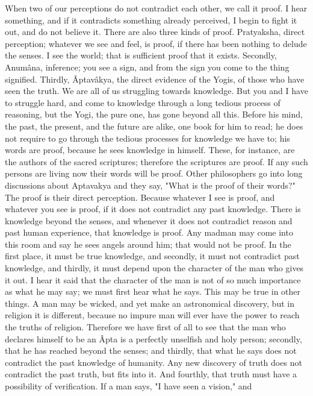 When two of our perceptions do not contradict each other, we
call it proof. I hear something, and if it contradicts something
already perceived, I begin to fight it out, and do not believe it.
There are also three kinds of proof. Pratyaksha, direct perception;
whatever we see and feel, is proof, if there has been nothing to delude
the senses. I see the world; that is sufficient proof that it exists.
Secondly, Anumâna, inference; you see a sign, and from the sign you
come to the thing signified. Thirdly, Âptavâkya, the direct evidence of
the Yogis, of those who have seen the truth. We are all of us
struggling towards knowledge. But you and I have to struggle hard, and
come to knowledge through a long tedious process of reasoning, but the
Yogi, the pure one, has gone beyond all this. Before his mind, the
past, the present, and the future are alike, one book for him to read;
he does not require to go through the tedious processes for knowledge
we have to; his words are proof, because he sees knowledge in himself.
These, for instance, are the authors of the sacred scriptures;
therefore the scriptures are proof. If any such persons are living now
their words will be proof. Other
philosophers go into long discussions about Aptavakya and they say,
"What is the proof of their words?" The proof is their direct
perception. Because whatever I see is proof, and whatever you see is
proof, if it does not contradict any past knowledge. There is knowledge
beyond the senses, and whenever it does not contradict reason and past
human experience, that knowledge is proof. Any madman may come into
this room and say he sees angels around him; that would not be proof.
In the first place, it must be true knowledge, and secondly, it must
not contradict past knowledge, and thirdly, it must depend upon the
character of the man who gives it out. I hear it said that the
character of the man is not of so much importance as what he may say;
we must first hear what he says. This may be true in other things. A
man may be wicked, and yet make an astronomical discovery, but in
religion it is different, because no impure man will ever have the
power to reach the truths of religion. Therefore we have first of all
to see that the man who declares himself to be an Âpta is a perfectly
unselfish and holy person; secondly, that he has reached beyond the
senses; and thirdly, that what he says does not contradict the past
knowledge of humanity. Any new discovery of truth does not contradict
the past truth, but fits into it. And fourthly, that truth must have a
possibility of verification. If a man says, "I have seen a vision," and
